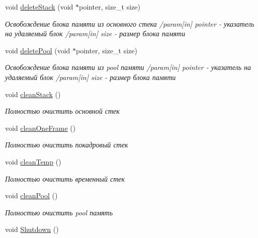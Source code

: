 \begin{DoxyCompactItemize}
void \hyperlink{class_memory_manager_class_a0dbaebe8e574a7cff0242a5d93977abc}{delete\+Stack} (void $\ast$pointer, size\+\_\+t size)
\begin{DoxyCompactList}\small\item\em Освобождение блока памяти из основного стека /param\mbox{[}in\mbox{]} pointer -\/ указатель на удаляемый блок /param\mbox{[}in\mbox{]} size -\/ размер блока памяти \end{DoxyCompactList}\item 
void \hyperlink{class_memory_manager_class_a9252f2b77af1d7bab6ea14e27ab13764}{delete\+Pool} (void $\ast$pointer, size\+\_\+t size)
\begin{DoxyCompactList}\small\item\em Освобождение блока памяти из pool памяти /param\mbox{[}in\mbox{]} pointer -\/ указатель на удаляемый блок /param\mbox{[}in\mbox{]} size -\/ размер блока памяти \end{DoxyCompactList}\item 
void \hyperlink{class_memory_manager_class_a3d568e53b61a6ae0d86060f4043d666d}{clean\+Stack} ()
\begin{DoxyCompactList}\small\item\em Полностью очистить основной стек \end{DoxyCompactList}\item 
void \hyperlink{class_memory_manager_class_a04c381a3fcd5c05a99cf73fb038b7589}{clean\+One\+Frame} ()
\begin{DoxyCompactList}\small\item\em Полностью очистить покадровый стек \end{DoxyCompactList}\item 
void \hyperlink{class_memory_manager_class_a2aca67cf7c270e92a0aba0eaa0039996}{clean\+Temp} ()
\begin{DoxyCompactList}\small\item\em Полностью очистить временный стек \end{DoxyCompactList}\item 
void \hyperlink{class_memory_manager_class_a133fe89cf9f7d72d1fbe15f35ed5c4c7}{clean\+Pool} ()
\begin{DoxyCompactList}\small\item\em Полностью очистить pool память \end{DoxyCompactList}\item 
void \hyperlink{class_memory_manager_class_aa3606f18bbcc8d10cbb63ed173c62f43}{Shutdown} ()
\end{DoxyCompactItemize}
